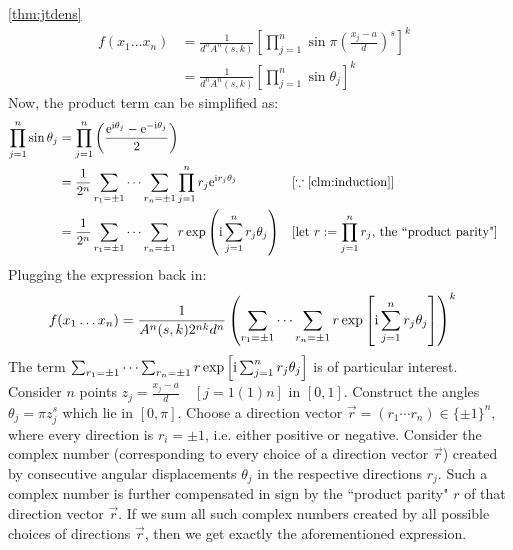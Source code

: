 \begin{proofof}{\autoref{thm:jtdens}}
    \begin{align*}
        f(x_1\dots x_n)
        &= \frac{1}{d^n A^n(s,k)} \left[ \prod_{j=1}^n \sin \pi \left( \frac{x_j-a}{d}\right)^s \right]^k & \\
        &=\frac{1}{d^n A^n(s,k)} \left[ \prod_{j=1}^n \sin \theta_j \right] ^k
    \end{align*}
    Now, the product term can be simplified as:
    \begin{align*}
        \prod_{j=1}^n \sin \theta_j
        &= \prod_{j=1}^n \left(\frac{\e^{\i\theta_j} - \e^{-\i\theta_j}}{2}\right)\\
        &= \frac{1}{2^n} \sum_{r_1=\pm1}\cdots \sum_{r_n = \pm 1} \prod_{j=1}^n r_j \e^{\i r_j \theta_j} && [\because \text{\autoref{clm:induction}}]\\
        &= \frac{1}{2^n} \sum_{r_1=\pm1}\cdots \sum_{r_n = \pm 1} r \exp\left(\i \sum_{j=1}^n r_j \theta_j\right) &&  [\text{let $r:=\prod_{j=1}^n r_j$, the ``product parity"}]
    \end{align*}
    Plugging the expression back in:
    \begin{align*}
        f(x_1\dots x_n)
        &= \frac{1}{A^n(s,k) 2^{nk} d^n } \left(\sum_{r_1=\pm1}\cdots \sum_{r_n = \pm 1} r \exp\left[\mathrm i \sum_{j=1}^n r_j \theta_j\right] \right)^k
    \end{align*}
    The term $\sum_{r_1=\pm1}\cdots \sum_{r_n = \pm 1} r \exp\left[\mathrm i \sum_{j=1}^n r_j \theta_j\right]$ is of particular interest. Consider $n$ points $z_j = \frac{x_j - a}{d} \quad [j=1(1)n]$ in $[0,1]$. Construct the angles $\theta_j = \pi z_j^s$ which lie in $[0, \pi]$. Choose a direction vector $\vec r = (r_1 \cdots r_n) \in \{\pm 1\}^n$, where every direction is $r_i =\pm 1$, i.e. either positive or negative. Consider the complex number (corresponding to every choice of a direction vector $\vec r$) created by consecutive angular displacements $\theta_j$ in the respective directions $r_j$. Such a complex number is further compensated in sign by the ``product parity" $r$ of that direction vector $\vec r$. If we sum all such complex numbers created by all possible choices of directions $\vec r$, then we get exactly the aforementioned expression.
\end{proofof}

